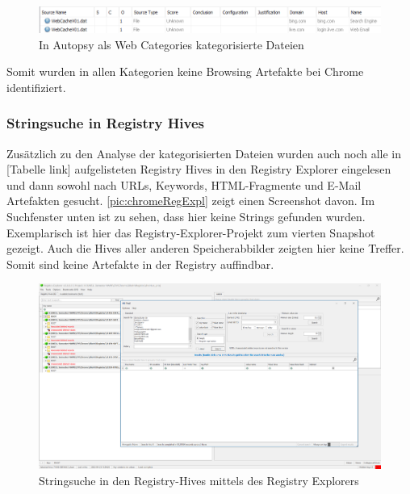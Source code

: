 \begin{appendices}

\begin{figure}[h!]
	\centering
	\includegraphics[width=\textwidth]{bilder/CHCat2.png}
	\caption{In Autopsy als \glqq{}Web Categories\grqq{} kategorisierte Dateien}
	\label{img:chrome-web-categories}  
\end{figure}

Somit wurden in allen Kategorien keine Browsing Artefakte bei Chrome identifiziert.

\subsubsection*{Stringsuche in Registry Hives}

Zusätzlich zu den Analyse der kategorisierten Dateien wurden auch noch alle in [Tabelle link] aufgelisteten Registry Hives in den Registry Explorer eingelesen und dann sowohl nach URLs, Keywords, HTML-Fragmente und E-Mail Artefakten gesucht. \autoref{pic:chromeRegExpl} zeigt einen Screenshot davon. Im Suchfenster unten ist zu sehen, dass hier keine Strings gefunden wurden. Exemplarisch ist hier das Registry-Explorer-Projekt zum vierten Snapshot gezeigt. Auch die Hives aller anderen Speicherabbilder zeigten hier keine Treffer. Somit sind keine Artefakte in der Registry auffindbar.

\begin{figure}[h!]
	\centering
	\includegraphics[width=\textwidth]{bilder/RegExpl.png}
	\caption{Stringsuche in den Registry-Hives mittels des Registry Explorers}
	\label{pic:chromeRegExpl}
\end{figure}


\end{appendices}
